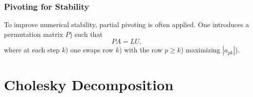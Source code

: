 \subsubsection{Pivoting for Stability}
To improve numerical stability, partial pivoting is often applied. One introduces a permutation matrix \(P\)) such that
\[
    PA = LU,
\]
where at each step \(k\)) one swaps row \(k\)) with the row \(p\ge k\)) maximizing \(| a_{p k} |\)).


\section{Cholesky Decomposition}
\label{sec:cholesky-decomposition}

